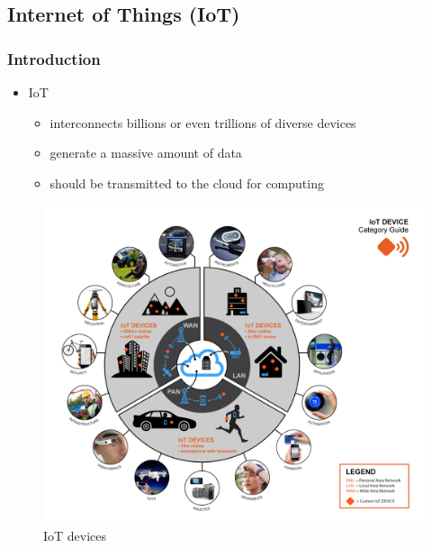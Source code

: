 \documentclass{beamer}
\begin{document}
\subsection[IoT]{Internet of Things (IoT)}
\begin{frame}
\frametitle{Introduction}
\begin{itemize}
	\item IoT
	\begin{itemize}
		\item {interconnects billions or
			even trillions of diverse devices}
		\item {generate a massive
			amount of data}
		\item {should be transmitted to the cloud for
			computing}
	\end{itemize}
\end{itemize}
\begin{figure}
	\includegraphics[scale=0.1]{IoT1}
	\caption{IoT devices}
	\label{fig:iot1}
\end{figure}
\end{frame}
\end{document}
